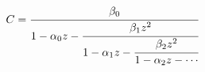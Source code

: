 \[C=\cfrac{\beta_{0}}{1-\alpha_{0}z-\cfrac{\beta_{1}z^{2}}{1-\alpha_{1}z-\cfrac{%
\beta_{2}z^{2}}{1-\alpha_{2}z-\cdots}}}\]